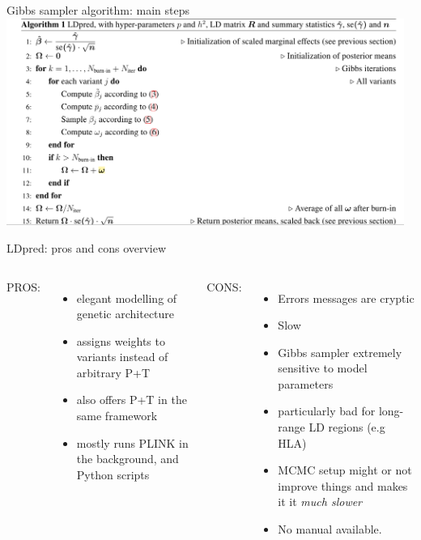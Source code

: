 \documentclass{beamer}
\begin{document}
            \begin{frame}{Gibbs sampler algorithm: main steps}
            \includegraphics[width=130mm,scale=1.3]{gibbs.png}
            \end{frame}
   

   \begin{frame}{LDpred: pros and cons overview}
   \begin{columns}[t, onlytextwidth]
    \textcolor{example}{PROS:}
    \begin{itemize}
            \item elegant modelling of genetic architecture
            \item assigns weights to variants instead of arbitrary P+T
            \item also offers P+T in the same framework
            \item mostly runs PLINK in the background, and Python scripts
         \end{itemize}
    \alert{CONS:} 
        \begin{itemize}
            \item Errors messages are cryptic
            \item \alert{Slow}
            \item Gibbs sampler \alert{extremely sensitive to model parameters}
            \item particularly bad for long-range LD regions (e.g HLA)
            \item MCMC setup might or not improve things and makes it it \emph{much slower}
            \item No manual available. 
            \end{itemize}
            \end{columns}
     \end{frame}
     
\end{document}

